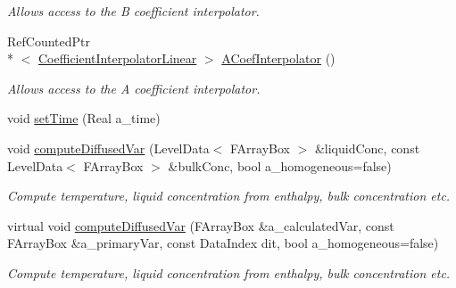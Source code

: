 \begin{DoxyCompactItemize}
\begin{DoxyCompactList}\small\item\em Allows access to the B coefficient interpolator. \end{DoxyCompactList}\item 
\hypertarget{class_a_m_r_non_linear_multi_comp_op_a3f2f1e5860115bff0d72527de816bc64}{Ref\-Counted\-Ptr\\*
$<$ \hyperlink{class_coefficient_interpolator_linear}{Coefficient\-Interpolator\-Linear} $>$ \hyperlink{class_a_m_r_non_linear_multi_comp_op_a3f2f1e5860115bff0d72527de816bc64}{A\-Coef\-Interpolator} ()}\label{class_a_m_r_non_linear_multi_comp_op_a3f2f1e5860115bff0d72527de816bc64}

\begin{DoxyCompactList}\small\item\em Allows access to the A coefficient interpolator. \end{DoxyCompactList}\item 
void \hyperlink{class_a_m_r_non_linear_multi_comp_op_afb810f3b1d7826edd752a2d90264cc8e}{set\-Time} (Real a\-\_\-time)
\item 
\hypertarget{class_a_m_r_non_linear_multi_comp_op_a8a43737a8d5fe5805ebbf3d72388df9b}{void \hyperlink{class_a_m_r_non_linear_multi_comp_op_a8a43737a8d5fe5805ebbf3d72388df9b}{compute\-Diffused\-Var} (Level\-Data$<$ F\-Array\-Box $>$ \&liquid\-Conc, const Level\-Data$<$ F\-Array\-Box $>$ \&bulk\-Conc, bool a\-\_\-homogeneous=false)}\label{class_a_m_r_non_linear_multi_comp_op_a8a43737a8d5fe5805ebbf3d72388df9b}

\begin{DoxyCompactList}\small\item\em Compute temperature, liquid concentration from enthalpy, bulk concentration etc. \end{DoxyCompactList}\item 
\hypertarget{class_a_m_r_non_linear_multi_comp_op_a7100d4ee1ab6e020e6fe62522c762b18}{virtual void \hyperlink{class_a_m_r_non_linear_multi_comp_op_a7100d4ee1ab6e020e6fe62522c762b18}{compute\-Diffused\-Var} (F\-Array\-Box \&a\-\_\-calculated\-Var, const F\-Array\-Box \&a\-\_\-primary\-Var, const Data\-Index dit, bool a\-\_\-homogeneous=false)}\label{class_a_m_r_non_linear_multi_comp_op_a7100d4ee1ab6e020e6fe62522c762b18}

\begin{DoxyCompactList}\small\item\em Compute temperature, liquid concentration from enthalpy, bulk concentration etc. \end{DoxyCompactList}\end{DoxyCompactItemize}
